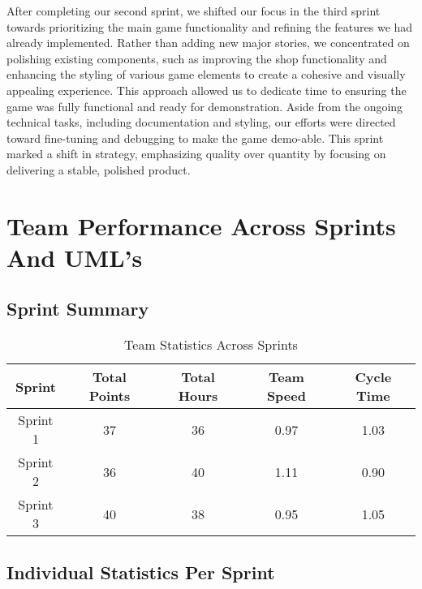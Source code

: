 \noindent After completing our second sprint, we shifted our focus in the third sprint towards prioritizing the main game functionality and refining the features we had already implemented. Rather than adding new major stories, we concentrated on polishing existing components, such as improving the shop functionality and enhancing the styling of various game elements to create a cohesive and visually appealing experience. This approach allowed us to dedicate time to ensuring the game was fully functional and ready for demonstration. Aside from the ongoing technical tasks, including documentation and styling, our efforts were directed toward fine-tuning and debugging to make the game demo-able. This sprint marked a shift in strategy, emphasizing quality over quantity by focusing on delivering a stable, polished product.

\pagebreak
\section{Team Performance Across Sprints And UML's}

\subsection{Sprint Summary}
\begin{table}[H]
    \centering
    \begin{tabular}{|c|c|c|c|c|}
    \hline
    \textbf{Sprint} & \textbf{Total Points} & \textbf{Total Hours} & \textbf{Team Speed} & \textbf{Cycle Time}  \\ \hline
    Sprint 1 & 37 & 36 & 0.97 & 1.03 \\ \hline
    Sprint 2 & 36 & 40 & 1.11 & 0.90 \\ \hline
    Sprint 3 & 40 & 38 & 0.95 & 1.05 \\ \hline
    \end{tabular}
    \caption{Team Statistics Across Sprints}
    \label{tab:team_stats}
\end{table}

\subsection{Individual Statistics Per Sprint}

